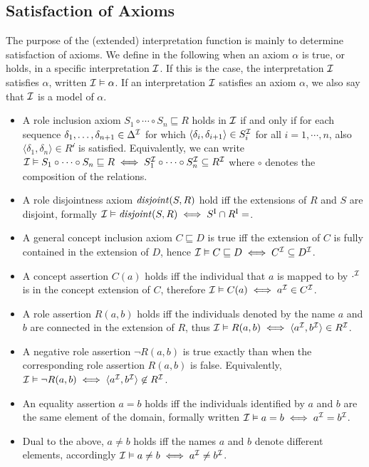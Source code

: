 \subsection{Satisfaction of Axioms} \label{satisfaction-of-axioms}

The purpose of the (extended) interpretation function is mainly to determine satisfaction of axioms. We define in the following when an axiom $\alpha$ is true, or holds, in a specific interpretation $\mathcal{I}$. If this is the case, the interpretation $\mathcal{I}$ satisfies $\alpha$, written $\mathcal{I} \vDash \alpha$. If an interpretation $\mathcal{I}$ satisfies an axiom $\alpha$, we also say that $\mathcal{I}$ is a model of $\alpha$.
\begin{itemize}
    \item A role inclusion axiom $S_1 \circ \cdots \circ S_n \sqsubseteq R$ holds in $\mathcal{I}$ if and only if for each sequence $\delta_1, \dots, \delta_{n + 1} \in \Delta^\mathcal{I}$ for which $\langle \delta_i , \delta_{i + 1} \rangle \in S_i^\mathcal{I}$ for all $i = 1, \cdots, n$, also $\langle \delta_1 , \delta_n \rangle \in R^\mathcal{i}$ is satisfied. Equivalently, we can write $\mathcal{I} \vDash S_1 \circ \cdots \circ S_n \sqsubseteq R \iff S_1^\mathcal{I} \circ \cdots \circ S_n^\mathcal{I} \subseteq R^\mathcal{I}$ where $\circ$ denotes the composition of the relations.
    \item A role disjointness axiom $\mathit{disjoint}(S, R)$ hold iff the extensions of $R$ and $S$ are disjoint, formally $\Imc \vDash \disjoint(S, R) \iff S^\mathrm{I} \cap R^\mathrm{I} = \empty$.
    \item A general concept inclusion axiom $C \sqsubseteq D$ is true iff the extension of $C$ is fully contained in the extension of $D$, hence $\mathcal{I} \vDash C \sqsubseteq D \iff C^\mathcal{I} \subseteq D^\mathcal{I}$.
    \item A concept assertion $C(a)$ holds iff the individual that $a$ is mapped to by $\cdot^\mathcal{I}$ is in the concept extension of $C$, therefore $\mathcal{I} \vDash C (a) \iff a^\mathcal{I} \in C^\mathcal{I}$.
    \item A role assertion $R(a, b)$ holds iff the individuals denoted by the name $a$ and $b$ are connected in the extension of $R$, thus $\mathcal{I} \vDash R(a, b) \iff \langle a^\mathcal{I}, b^\mathcal{I} \rangle \in R^\mathcal{I}$.
    \item A negative role assertion $\lnot R(a, b)$ is true exactly than when the corresponding role assertion $R(a, b)$ is false. Equivalently, $\mathcal{I} \vDash \lnot R(a, b) \iff \langle a^\mathcal{I}, b^\mathcal{I} \rangle \not\in R^\mathcal{I}$.
    \item An equality assertion $a = b$ holds iff the individuals identified by $a$ and $b$ are the same element of the domain, formally written $\mathcal{I} \vDash a = b \iff a^\mathcal{I} = b^\mathcal{I}$.
    \item Dual to the above, $a \not = b$ holds iff the names $a$ and $b$ denote different elements, accordingly $\mathcal{I} \vDash a \not= b \iff a^\mathcal{I} \not= b^\mathcal{I}$.
\end{itemize}
